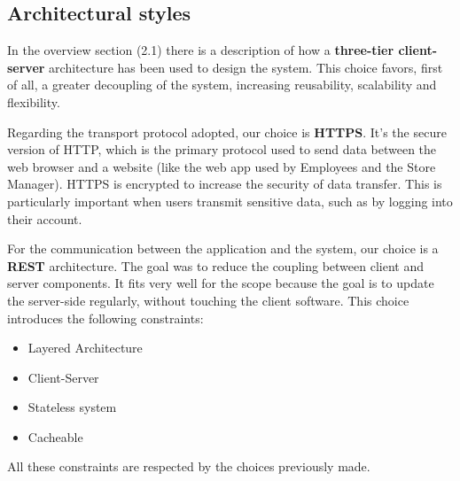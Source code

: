 \subsection{Architectural styles}
In the overview section (2.1) there is a description of how a \textbf{three-tier client-server} architecture has been used to design the system. This choice favors, first of all, a greater decoupling of the system, increasing reusability, scalability and
flexibility. 

Regarding the transport protocol adopted, our choice is \textbf{HTTPS}. It's the secure version of HTTP, which is the primary protocol used to send data between the web browser and a website (like the web app used by Employees and the Store Manager). HTTPS is encrypted to increase the security of data transfer. This is particularly important when users transmit sensitive data, such as by logging into their account.

For the communication between the application and the system, our choice is a \textbf{REST} architecture. The goal was to reduce the coupling between client and server components. It fits very well for the scope because the goal is to update the server-side regularly, without touching the client software. This choice introduces the following constraints:
\begin{itemize}
    \item Layered Architecture
    \item Client-Server
    \item Stateless system
    \item Cacheable
\end{itemize}
All these constraints are respected by the choices previously made.

